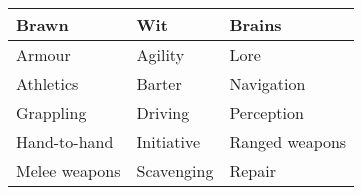 
{\small\begin{tabular}{lll}
  Brawn         & Wit        & Brains         \\
  \hline
  Armour        & Agility    & Lore           \\
  Athletics     & Barter     & Navigation     \\
  Grappling     & Driving    & Perception     \\
  Hand-to-hand  & Initiative & Ranged weapons \\
  Melee weapons & Scavenging & Repair
\end{tabular}}
